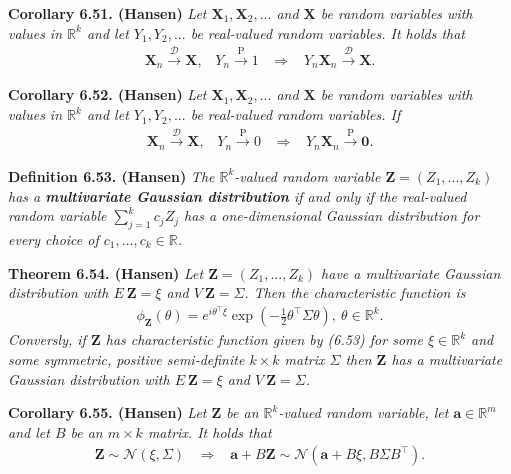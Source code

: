 \documentclass[a4paper,12pt,openany]{book}
\begin{document}
\textbf{Corollary 6.51. (Hansen)} \emph{Let \(\mathbf{X}_1,\mathbf{X}_2,...\) and \(\mathbf{X}\) be random variables with values in \(\mathbb{R}^k\) and let \(Y_1,Y_2,...\) be real-valued random variables. It holds that}
\begin{align*}
    \mathbf{X}_n\stackrel{\mathcal{D}}{\to} \mathbf{X},\hspace{10pt}Y_n\stackrel{\text{P}}{\to} 1\hspace{10pt}\Rightarrow\hspace{10pt} Y_n\mathbf{X}_n\stackrel{\mathcal{D}}{\to}\mathbf{X}.
\end{align*}

\textbf{Corollary 6.52. (Hansen)} \emph{Let \(\mathbf{X}_1,\mathbf{X}_2,...\) and \(\mathbf{X}\) be random variables with values in \(\mathbb{R}^k\) and let \(Y_1,Y_2,...\) be real-valued random variables. If}
\begin{align*}
    \mathbf{X}_n\stackrel{\mathcal{D}}{\to} \mathbf{X},\hspace{10pt}Y_n\stackrel{\text{P}}{\to} 0\hspace{10pt}\Rightarrow\hspace{10pt} Y_n\mathbf{X}_n\stackrel{\text{P}}{\to} \mathbf{0}.
\end{align*}

\textbf{Definition 6.53. (Hansen)} \emph{The \(\mathbb{R}^k\)-valued random variable \(\mathbf{Z}=(Z_1,...,Z_k)\) has a \textbf{multivariate Gaussian distribution} if and only if the real-valued random variable \(\sum_{j=1}^kc_jZ_j\) has a one-dimensional Gaussian distribution for every choice of \(c_1,...,c_k\in\mathbb{R}\).}

\textbf{Theorem 6.54. (Hansen)} \emph{Let \(\mathbf{Z}=(Z_1,...,Z_k)\) have a multivariate Gaussian distribution with \(E\ \mathbf{Z}=\xi\) and \(V\ \mathbf{Z}=\Sigma\). Then the characteristic function is}
\begin{align*}
    \phi_\mathbf{Z}(\theta)=e^{i\theta^\top\xi}\exp\left(-\frac{1}{2}\theta^\top\Sigma\theta\right),\ \theta\in\mathbb{R}^k.\tag{6.53}
\end{align*}
\emph{Conversly, if \(\mathbf{Z}\) has characteristic function given by (6.53) for some \(\xi\in\mathbb{R}^k\) and some symmetric, positive semi-definite \(k\times k\) matrix \(\Sigma\) then \(\mathbf{Z}\) has a multivariate Gaussian distribution with \(E\ \mathbf{Z}=\xi\) and \(V\ \mathbf{Z}=\Sigma\).}

\textbf{Corollary 6.55. (Hansen)} \emph{Let \(\mathbf{Z}\) be an \(\mathbb{R}^k\)-valued random variable, let \(\mathbf{a}\in\mathbb{R}^m\) and let \(B\) be an \(m\times k\) matrix. It holds that}
\begin{align*}
    \mathbf{Z}\sim \mathcal{N}(\xi,\Sigma)\hspace{10pt}\Rightarrow\hspace{10pt} \mathbf{a}+B\mathbf{Z}\sim \mathcal{N}\left(\mathbf{a}+B\xi,B\Sigma B^\top\right).
\end{align*}
\end{document}
